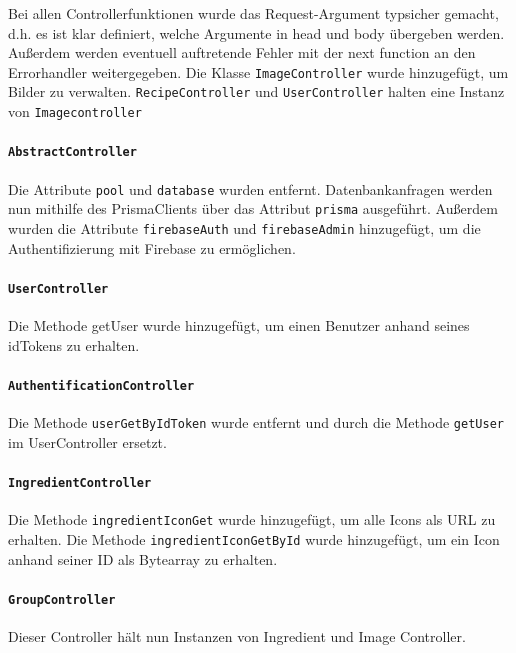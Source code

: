 \documentclass{implementierungsheft}
\begin{document}
Bei allen Controllerfunktionen wurde das Request-Argument typsicher gemacht, d.h. es ist klar definiert, welche Argumente in head und body übergeben werden. 
Außerdem werden eventuell auftretende Fehler mit der next function an den Errorhandler weitergegeben. Die Klasse \texttt{ImageController} wurde hinzugefügt, um Bilder zu verwalten. 
\texttt{RecipeController} und \texttt{UserController} halten eine Instanz von \texttt{Imagecontroller}

\paragraph{\texttt{AbstractController}} Die Attribute \texttt{pool} und \texttt{database} wurden entfernt. Datenbankanfragen werden nun mithilfe des PrismaClients über das Attribut \texttt{prisma} ausgeführt. 
Außerdem wurden die Attribute \texttt{firebaseAuth} und \texttt{firebaseAdmin} hinzugefügt, um die Authentifizierung mit Firebase zu ermöglichen.

\paragraph{\texttt{UserController}} Die Methode getUser wurde hinzugefügt, um einen Benutzer anhand seines idTokens zu erhalten.

\paragraph{\texttt{AuthentificationController}} Die Methode \texttt{userGetByIdToken} wurde entfernt und durch die Methode \texttt{getUser} im UserController ersetzt.

\paragraph{\texttt{IngredientController}} Die Methode \texttt{ingredientIconGet} wurde hinzugefügt, um alle Icons als URL zu erhalten. Die Methode \texttt{ingredientIconGetById} wurde hinzugefügt, um ein Icon anhand seiner ID als Bytearray zu erhalten.

\paragraph{\texttt{GroupController}} Dieser Controller hält nun Instanzen von Ingredient und Image Controller.
\end{document}
